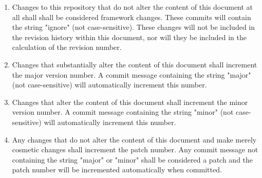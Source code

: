     \begin{enumerate}
       \item Changes to this repository that do not alter the content of this
                document at all shall shall be considered framework changes. These
                commits will contain the string "ignore" (not case-sensitive). These
                changes will not be included in the revision history within this
                document, nor will they be included in the calculation of the
                revision number.
       \item Changes that substantially alter the content of this document shall
                increment the major version number. A commit message containing the
                string "major" (not case-sensitive) will automatically increment this
                number.
        \item Changes that alter the content of this document shall increment the
                minor version number. A commit message containing the string "minor"
                (not case-sensitive) will automatically increment this number.
        \item Any changes that do not alter the content of this document and make
                merely cosmetic changes shall increment the patch number.
                Any commit message not containing the string "major" or "minor" shall be
                considered a patch and the patch number will be
                incremented automatically when committed.
    \end{enumerate}
